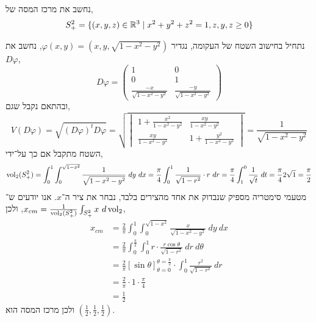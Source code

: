 \question{}
\subquestion{}
נחשב את מרכז המסה של,
\[
	S_+^2
	= \{ (x, y, z) \in \mathbb{R}^3 \mid x^2 + y^2 + z^2 = 1, z, y, z \ge 0 \}
\]
\begin{solution}
	נתחיל בחישוב השטח של העקומה,
	נגדיר $\varphi(x, y) = (x, y, \sqrt{1 - x^2 - y^2})$,
	נחשב את $D\varphi$,
	\[
		D\varphi
		= \begin{pmatrix}
			1 & 0 \\
			0 & 1 \\
			\frac{-x}{\sqrt{1 - x^2 - y^2}} & \frac{-y}{\sqrt{1 - x^2 - y^2}}
		\end{pmatrix}
	\]
	ובהתאם נקבל שגם,
	\[
		V(D\varphi)
		= \sqrt{{(D\varphi)}^t D\varphi}
		= \sqrt{\begin{vmatrix}
				1 + \frac{x^2}{1 - x^2 - y^2} & \frac{xy}{1 - x^2 - y^2} \\
				\frac{xy}{1 - x^2 - y^2} & 1 + \frac{y^2}{1 - x^2 - y^2}
		\end{vmatrix}}
		= \frac{1}{\sqrt{1 - x^2 - y^2}}
	\]
	השטח מתקבל אם כך על־ידי,
	\[
		\operatorname{vol}_2(S_+^2)
		= \int_0^1 \int_0^{\sqrt{1 - x^2}} \frac{1}{\sqrt{1 - x^2 - y^2}}\ dy\ dx
		= \frac{\pi}{4} \int_0^1 \frac{1}{\sqrt{1 - r^2}} \cdot r\ dr
		= \frac{\pi}{4} \int_{1}^{0} \frac{1}{\sqrt{t}}\ dt
		= \frac{\pi}{4} 2 \sqrt{1}
		= \frac{\pi}{2}
	\]
	מטעמי סימטריה מספיק שנבדוק את אחד מהצירים בלבד, נבחר את ציר ה־$x$.
	אנו יודעים ש־$x_{cm} = \frac{1}{\operatorname{vol}_2(S_+^2)} \int_{S_+^2} x\ d\operatorname{vol}_2$, ולכן,
	\begin{align*}
		x_{cm}
		& = \frac{2}{\pi} \int_0^1 \int_0^{\sqrt{1 - x^2}} \frac{x}{\sqrt{1 - x^2 - y^2}}\ dy\ dx \\
		& = \frac{2}{\pi} \int_{0}^{\frac{\pi}{2}} \int_{0}^{1} r \cdot \frac{r \cos \theta}{\sqrt{1 - r^2}}\ dr\ d\theta \\
		& = \frac{2}{\pi} {\left[ \sin \theta \right]}_{\theta = 0}^{\theta = \frac{\pi}{2}} \cdot \int_0^1 \frac{r^2}{\sqrt{1 - r^2}}\ dr \\
		& = \frac{2}{\pi} \cdot 1 \cdot \frac{\pi}{4} \\
		& = \frac{1}{2}
	\end{align*}
	ולכן מרכז המסה הוא $(\frac{1}{2}, \frac{1}{2}, \frac{1}{2})$.
\end{solution}

